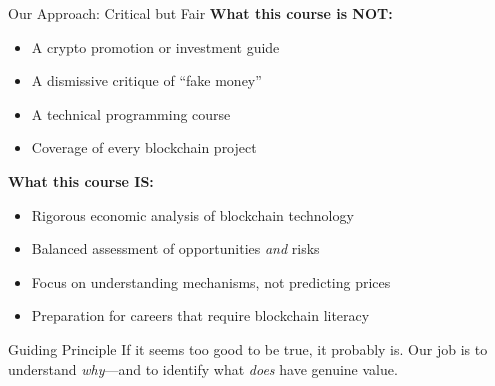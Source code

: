 \documentclass[10pt]{beamer}
\begin{document}
\begin{frame}{Our Approach: Critical but Fair}
  \textbf{What this course is NOT:}
  \begin{itemize}
    \item A crypto promotion or investment guide
    \item A dismissive critique of ``fake money''
    \item A technical programming course
    \item Coverage of every blockchain project
  \end{itemize}
  
  \vspace{1em}
  \textbf{What this course IS:}
  \begin{itemize}
    \item Rigorous economic analysis of blockchain technology
    \item Balanced assessment of opportunities \textit{and} risks
    \item Focus on understanding mechanisms, not predicting prices
    \item Preparation for careers that require blockchain literacy
  \end{itemize}
  
  \vspace{1em}
  \begin{block}{Guiding Principle}
    If it seems too good to be true, it probably is. Our job is to understand \textit{why}---and to identify what \textit{does} have genuine value.
  \end{block}
\end{frame}
\end{document}

